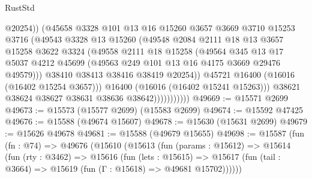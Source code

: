 \begin{lexlean}{RustStd}
\begin{coremodule}
                                @20254))
                            (@45658
                              @3328
                              @101
                              @13
                              @16
                              @15260
                              @3657
                              @3669
                              @3710
                              @15253
                              @3716
                              (@49543
                                @3328
                                @13
                                @15260
                                (@49548
                                  @2084
                                  @2111
                                  @18
                                  @13
                                  @3657
                                  @15258
                                  @3622
                                  @3324
                                  (@49558
                                    @2111
                                    @18
                                    @15258
                                    (@49564
                                      @345
                                      @13
                                      @17
                                      @5037
                                      @4212
                                      @45699
                                      (@49563 @249 @101 @13 @16 @4175 @3669 @29476 @49579)))
                                  @38410
                                  @38413
                                  @38416
                                  @38419
                                  @20254))
                              @45721
                              @16400
                              (@16016 (@16402 @15254 @3657)))
                            @16400
                            (@16016 (@16402 @15241 @15263)))
                          @38621
                          @38624
                          @38627
                          @38631
                          @38636
                          @38642)))))))))))
@49669 := @15571 @2699
@49673 := @15573 (@15577 @2699) (@15583 @2699)
@49674 := @15592 @47425
@49676 := @15588 (@49674 @15607)
@49678 := @15630 (@15631 @2699)
@49679 := @15626 @49678
@49681 := @15588 (@49679 @15655)
@49698 := @15587
    (fun (fn : @74) =>
    @49676
      (@15610
        (@15613
          (fun (params : @15612) =>
          @15614
            (fun (rty : @3462) =>
            @15616
              (fun (lets : @15615) =>
              @15617 (fun (tail : @3664) => @15619 (fun (Γ : @15618) => @49681 @15702))))))

\end{coremodule}
\end{lexlean}
